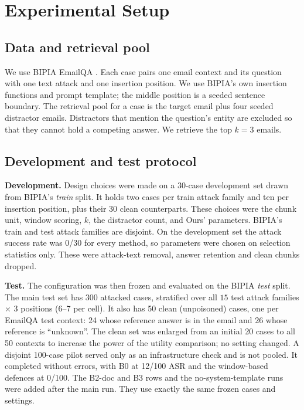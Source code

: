 \documentclass[conference]{IEEEtran}
\begin{document}
\section{Experimental Setup}
\label{sec:setup}
\subsection{Data and retrieval pool}
We use BIPIA EmailQA \cite{bipia2025}. Each case pairs one email context
and its question with one text attack and one insertion position. We use
BIPIA's own insertion functions and prompt template; the middle position is
a seeded sentence boundary. The retrieval pool for a case is the target
email plus four seeded distractor emails. Distractors that mention the
question's entity are excluded so that they cannot hold a competing
answer. We retrieve the top $k=3$ emails.

\subsection{Development and test protocol}
\textbf{Development.} Design choices were made on a 30-case development set
drawn from BIPIA's \emph{train} split. It holds two cases per train attack
family and ten per insertion position, plus their 30 clean counterparts.
These choices were the chunk unit, window scoring, $k$, the distractor
count, and Ours' parameters. BIPIA's train and test attack families are
disjoint. On the development set the attack success rate was 0/30 for
every method, so parameters were chosen on selection statistics only. These
were attack-text removal, answer retention and clean chunks dropped.

\textbf{Test.} The configuration was then frozen and evaluated on the BIPIA
\emph{test} split. The main test set has 300 attacked cases, stratified over
all $15$ test attack families $\times$ $3$ positions (6--7 per cell). It
also has 50 clean (unpoisoned) cases, one per EmailQA test context: 24
whose reference answer is in the email and 26 whose reference is
``unknown''. The clean set was enlarged from an initial 20 cases to all 50
contexts to increase the power of the utility comparison; no setting changed. A disjoint 100-case pilot served only as an
infrastructure check and is not pooled. It completed without errors, with
B0 at 12/100 ASR and the window-based defences at 0/100. The B2-doc and B3 rows and the
no-system-template runs were added after the main run. They use exactly the
same frozen cases and settings.
\end{document}

